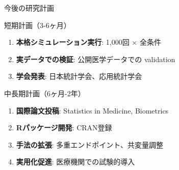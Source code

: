 \documentclass[11pt,aspectratio=169]{beamer}
\begin{document}
\begin{frame}{今後の研究計画}
\begin{block}{短期計画（3-6ヶ月）}
\begin{enumerate}
\item \textbf{本格シミュレーション実行}: 1,000回 × 全条件
\item \textbf{実データでの検証}: 公開医学データでの validation
\item \textbf{学会発表}: 日本統計学会、応用統計学会
\end{enumerate}
\end{block}

\vspace{1em}

\begin{block}{中長期計画（6ヶ月-2年）}
\begin{enumerate}
\item \textbf{国際論文投稿}: Statistics in Medicine, Biometrics
\item \textbf{Rパッケージ開発}: CRAN登録
\item \textbf{手法の拡張}: 多重エンドポイント、共変量調整
\item \textbf{実用化促進}: 医療機関での試験的導入
\end{enumerate}
\end{block}
\end{frame}
\end{document}
